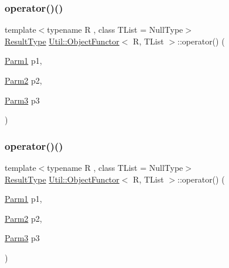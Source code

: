 \mbox{\label{classUtil_1_1ObjectFunctor_a6dea319b30584bd1bb9f6bf4b8d36e11}} 
\subsubsection{\texorpdfstring{operator()()}{operator()()}\hspace{0.1cm}{\footnotesize\ttfamily [7/12]}}
{\footnotesize\ttfamily template$<$typename R , class T\+List  = Null\+Type$>$ \\
\mbox{\hyperlink{classUtil_1_1ObjectFunctor_a77f816e98108848347d0dfc085090a1c}{Result\+Type}} \mbox{\hyperlink{classUtil_1_1ObjectFunctor}{Util\+::\+Object\+Functor}}$<$ R, T\+List $>$\+::operator() (\begin{DoxyParamCaption}\item[{\mbox{\hyperlink{classUtil_1_1ObjectFunctor_a199715d28029627c2ae7219c13b04d26}{Parm1}}}]{p1,  }\item[{\mbox{\hyperlink{classUtil_1_1ObjectFunctor_a6809cf65883dc7575e01d9b9849649cf}{Parm2}}}]{p2,  }\item[{\mbox{\hyperlink{classUtil_1_1ObjectFunctor_a6becd26610c6091b9ba93cd96f3def66}{Parm3}}}]{p3 }\end{DoxyParamCaption})\hspace{0.3cm}{\ttfamily [inline]}}

\mbox{\label{classUtil_1_1ObjectFunctor_a6dea319b30584bd1bb9f6bf4b8d36e11}} 
\subsubsection{\texorpdfstring{operator()()}{operator()()}\hspace{0.1cm}{\footnotesize\ttfamily [8/12]}}
{\footnotesize\ttfamily template$<$typename R , class T\+List  = Null\+Type$>$ \\
\mbox{\hyperlink{classUtil_1_1ObjectFunctor_a77f816e98108848347d0dfc085090a1c}{Result\+Type}} \mbox{\hyperlink{classUtil_1_1ObjectFunctor}{Util\+::\+Object\+Functor}}$<$ R, T\+List $>$\+::operator() (\begin{DoxyParamCaption}\item[{\mbox{\hyperlink{classUtil_1_1ObjectFunctor_a199715d28029627c2ae7219c13b04d26}{Parm1}}}]{p1,  }\item[{\mbox{\hyperlink{classUtil_1_1ObjectFunctor_a6809cf65883dc7575e01d9b9849649cf}{Parm2}}}]{p2,  }\item[{\mbox{\hyperlink{classUtil_1_1ObjectFunctor_a6becd26610c6091b9ba93cd96f3def66}{Parm3}}}]{p3 }\end{DoxyParamCaption})\hspace{0.3cm}{\ttfamily [inline]}}

